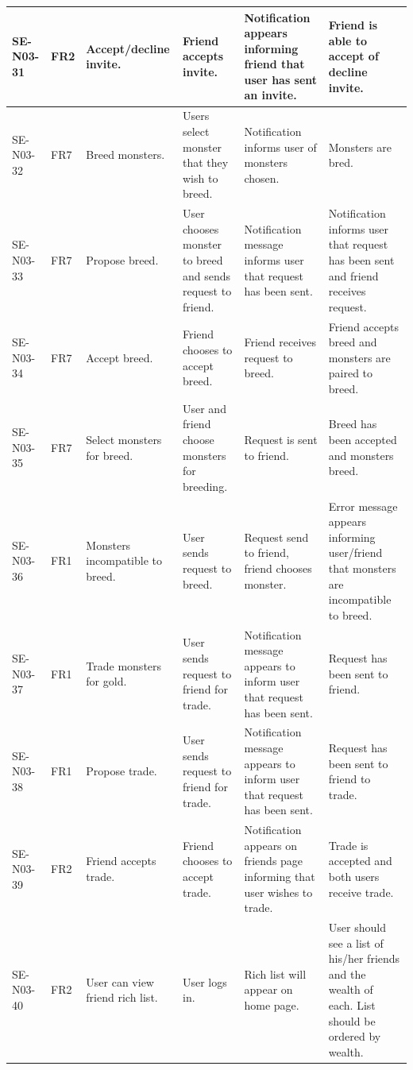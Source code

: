 \documentclass[a4paper]{article}
\begin{document}
\begin{landscape}
\begin{center}
\thispagestyle{empty}		
	\begin{tabular}{| l | l | p{3cm} | p{3cm} | p{5cm} | p{7cm} |}
	\hline
	SE-N03-31 & FR2 & Accept/decline invite. & Friend accepts invite. & Notification appears informing friend that user has sent an invite. & Friend is able to accept of decline invite. \\
	\hline
	SE-N03-32 & FR7 & Breed monsters. & Users select monster that they wish to breed. & Notification informs user of monsters chosen. & Monsters are bred.\\
	\hline
	SE-N03-33 & FR7 & Propose breed. & User chooses monster to breed and sends request to friend. & Notification message informs user that request has been sent. & Notification informs user that 	request has been sent and friend receives request.\\
	\hline
	SE-N03-34 & FR7 & Accept breed. & Friend chooses to accept breed. & Friend receives request to breed. & Friend accepts breed and monsters are paired to breed.\\
	\hline
	SE-N03-35 & FR7 & Select monsters for breed. & User and friend choose monsters for breeding. & Request is sent to friend. & Breed has been accepted and monsters breed.\\
	\hline
	SE-N03-36 & FR1 & Monsters incompatible to breed. & User sends request to breed. & Request send to friend, friend chooses monster. & Error message appears informing user/friend that monsters are 		incompatible to breed.\\
	\hline
	SE-N03-37 & FR1 & Trade monsters for gold. & User sends request to friend for trade. & Notification message appears to inform user that request has been sent. &  Request has been sent to friend.\\
	\hline
	SE-N03-38 & FR1 & Propose trade. & User sends request to friend for trade. & Notification message appears to inform user that request has been sent. &  Request has been sent to friend to trade.\\
	\hline
	SE-N03-39 & FR2 & Friend accepts trade. & Friend chooses to accept trade. & Notification appears on friends page informing that user wishes to trade. & Trade is accepted and both users receive trade.\\
	\hline
	SE-N03-40 & FR2 & User can view friend rich list. & User logs in. & Rich list will appear on home page. & User should see a list of his/her friends and the wealth of each. List should be ordered by wealth.		\\

\end{tabular}
\end{center}
\end{landscape}
\end{document}
